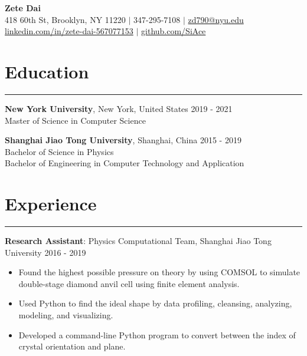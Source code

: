 \documentclass{article}
\begin{document}

\begin{center}
  {\Large\textbf{Zete Dai}} \\
  418 60th St, Brooklyn, NY 11220 $|$
  347-295-7108 $|$
  \href{mailto:zd790@nyu.edu}{zd790@nyu.edu} \\
  \href{https://www.linkedin.com/in/zete-dai-567077153/}{linkedin.com/in/zete-dai-567077153} $|$
  \href{https://github.com/SiAce}{github.com/SiAce}
  
\end{center}

\section{Education}
\hrule
\vspace{1em}

\textbf{New York University}, New York, United States \hfill
2019 - 2021 \\
Master of Science in Computer Science

\vspace{1em}

\textbf{Shanghai Jiao Tong University}, Shanghai, China \hfill
2015 - 2019 \\
Bachelor of Science in Physics \\
Bachelor of Engineering in Computer Technology and Application

\section{Experience}
\hrule
\vspace{1em}

\textbf{Research Assistant}: Physics Computational Team, Shanghai Jiao Tong University \hfill
2016 - 2019

\begin{itemize}[nosep]
	\item Found the highest possible pressure on theory by using COMSOL to simulate double-stage diamond anvil cell
	using finite element analysis.
	\item Used Python to find the ideal shape by data profiling, cleansing, analyzing, modeling, and visualizing.
	\item Developed a command-line Python program to convert between the index of crystal orientation and plane.
\end{itemize}

\vspace{1em}
\end{document}
